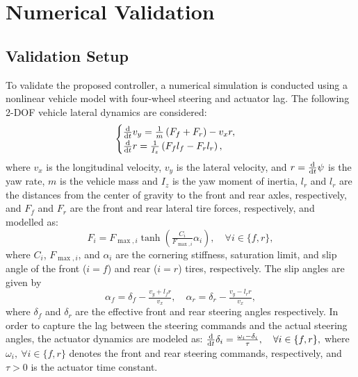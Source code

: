 \documentclass[letterpaper, journal]{IEEEtran}
\newcommand*{\Ff}{F_f}
\newcommand*{\Fr}{F_r}
\newcommand*{\delf}{\delta_f}
\newcommand*{\delr}{\delta_r}
\newcommand*{\lf}{l_f}
\newcommand*{\lr}{l_r}
\newcommand*{\alpf}{\alpha_f}
\newcommand*{\alpr}{\alpha_r}
\begin{document}
\section{Numerical Validation}

\subsection{Validation Setup}

To validate the proposed controller, a numerical simulation is conducted using a nonlinear vehicle model with four-wheel steering and actuator lag.
The following 2-DOF vehicle lateral dynamics \cite{Rajamani:2011aa} are considered:
\begin{equation} \label{eq:sys:lat:dyn}
  \begin{cases}
    \ddtt v_y
    =
    \tfrac{1}{m} 
    \left(
    \Ff + \Fr
    \right)
    -
    v_x r
    ,
    \\
    \ddtt r
    =
    \tfrac{1}{I_z}
    \left(
      \Ff\lf-\Fr\lr
    \right)
    ,
  \end{cases}
\end{equation}
where $v_x$ is the longitudinal velocity, $v_y$ is the lateral velocity, and $r=\tfrac{\mathrm d}{\mathrm d t}\psi$ is the yaw rate, $m$ is the vehicle mass and $I_z$ is the yaw moment of inertia, $\lr$ and $\lr$ are the distances from the center of gravity to the front and rear axles, respectively, and $\Ff$ and $\Fr$ are the front and rear lateral tire forces, respectively, and modelled as:
\begin{equation} \label{eq:sys:lat:dyn:tire}
    F_{i}
    = 
    F_{\max,i}
    \tanh
    \left(
      \tfrac{C_i}{F_{\max,i}}\alpha_i
    \right)
    , 
    \quad
    \forall i \in \{f,r\}
    ,
\end{equation}
where $C_i$, $F_{\max,i}$, and $\alpha_i$ are the cornering stiffness, saturation limit, and slip angle of the front ($i=f$) and rear ($i=r$) tires, respectively.
The slip angles are given by
\begin{equation}
    \alpf
    = 
    \delf
    - 
    \tfrac{v_y+\lf r}{v_x}
    , 
    \quad
    \alpr 
    = 
    \delr - 
    \tfrac{v_y-\lr r}{v_x}
    ,
\end{equation}
where $\delf$ and $\delr$ are the effective front and rear steering angles respectively. 
In order to capture the lag between the steering commands and the actual steering angles, the actuator dynamics are modeled as:
$
    \tfrac{\mathrm d}{\mathrm d t} \delta_i
    = \tfrac{\omega_i-\delta_i}{\tau}
    , 
    \quad
    \forall i \in \{f,r\}
    ,
$
where $\omega_i,\ \forall i\in\{f,r\}$ denotes the front and rear steering commands, respectively, and $\tau>0$ is the actuator time constant.
\end{document}
